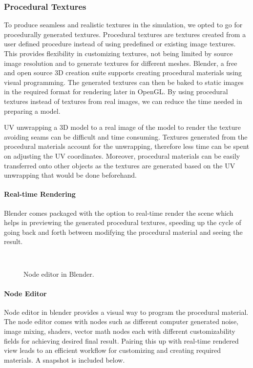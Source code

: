 \subsubsection{Procedural Textures}\label{sssec:procedural}
To produce seamless and realistic textures in the simulation, we opted to go for procedurally generated textures. Procedural textures are textures created from a user defined procedure instead of using predefined or existing image textures. This provides flexibility in customizing textures, not being limited by source image resolution and to generate textures for different meshes. Blender, a free and open source 3D creation suite supports creating procedural materials using visual programming. The generated textures can then be baked to static images in the required format for rendering later in OpenGL. By using procedural textures instead of textures from real images, we can reduce the time needed in preparing a model.

UV unwrapping a 3D model to a real image of the model to render the texture avoiding seams can be difficult and time consuming. Textures generated from the procedural materials account for the unwrapping, therefore less time can be spent on adjusting the UV coordinates. Moreover, procedural materials can be easily transferred onto other objects as the textures are generated based on the UV unwrapping that would be done beforehand.

\paragraph{Real-time Rendering}
Blender comes packaged with the option to real-time render the scene which helps in previewing the generated procedural textures, speeding up the cycle of going back and forth between modifying the procedural material and seeing the result.

\begin{figure}
  \centering%
  \setlength{\fboxsep}{0pt}%
  \setlength{\fboxrule}{0.1pt}%
  \\[2ex]
  \caption{Node editor in Blender.}\label{fig:procedural_textures}
\end{figure}

\paragraph{Node Editor}
Node editor in blender provides a visual way to program the procedural material. The node editor comes with nodes such as different computer generated noise, image mixing, shaders, vector math nodes each with different customizability fields for achieving desired final result. Pairing this up with real-time rendered view leads to an efficient workflow for customizing and creating required materials. A snapshot is included below.

